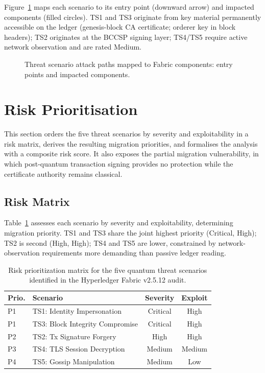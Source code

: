 \documentclass[conference]{IEEEtran}
\begin{document}
Figure~\ref{fig:threat_attack_paths} maps each scenario to its entry point
(downward arrow) and impacted components (filled circles). TS1 and TS3 originate
from key material permanently accessible on the ledger (genesis-block CA
certificate; orderer key in block headers); TS2 originates at the BCCSP signing
layer; TS4/TS5 require active network observation and are rated Medium.

\begin{figure}[t]
\centering

\caption{Threat scenario attack paths mapped to Fabric components: entry points and impacted components.}
\label{fig:threat_attack_paths}
\end{figure}

\section{Risk Prioritisation}
\label{sec:tm_risk}
This section orders the five threat scenarios by severity and exploitability in a risk matrix, derives the resulting migration priorities, and formalises the analysis with a composite risk score. It also exposes the partial migration vulnerability, in which post-quantum transaction signing provides no protection while the certificate authority remains classical.

\subsection{Risk Matrix}
Table~\ref{tab:risk_matrix} assesses each scenario by severity and
exploitability, determining migration priority. TS1 and TS3 share the joint
highest priority (Critical, High); TS2 is second (High, High); TS4 and TS5 are
lower, constrained by network-observation requirements more demanding than
passive ledger reading.

\begin{table}[t]
\centering
\caption{Risk prioritization matrix for the five quantum threat scenarios identified in the Hyperledger Fabric v2.5.12 audit.}
\label{tab:risk_matrix}
\setlength{\tabcolsep}{3pt}
\footnotesize
\begin{tabular}{@{}>{\raggedright\arraybackslash}p{0.7cm}>{\raggedright\arraybackslash}p{5cm}cc@{}}
\toprule
\textbf{Prio.} & \textbf{Scenario} & \textbf{Severity} &
\textbf{Exploit} \\
\midrule
P1 & TS1: Identity Impersonation & Critical & High \\
P1 & TS3: Block Integrity Compromise & Critical & High \\
P2 & TS2: Tx Signature Forgery & High & High \\
P3 & TS4: TLS Session Decryption & Medium & Medium \\
P4 & TS5: Gossip Manipulation & Medium & Low \\
\bottomrule
\end{tabular}
\end{table}
\end{document}
